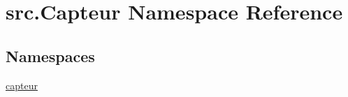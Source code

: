 \hypertarget{namespacesrc_1_1_capteur}{}\section{src.\+Capteur Namespace Reference}
\label{namespacesrc_1_1_capteur}
\subsection*{Namespaces}
\begin{DoxyCompactItemize}
\item 
 \hyperlink{namespacesrc_1_1_capteur_1_1capteur}{capteur}
\end{DoxyCompactItemize}
